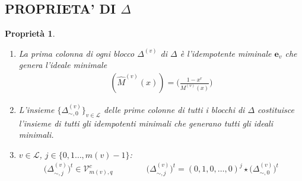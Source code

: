 \documentclass[mathserif]{beamer}
\def\quotient#1#2{%
   \raise1ex\hbox{$#1$}\Big/\lower1ex\hbox{$#2$}%
}
\newtheorem{prop}{Proprietà}
\begin{document}


\subsection{PROPRIETA' DI $\Delta$}
\begin{frame}
    \begin{prop}
    \begin{enumerate}
      \item  La prima colonna di ogni blocco $\Delta^{(v)}$ di $\Delta$ è l'idempotente miminale $\mathbf{e}_{v}$ che genera l'ideale minimale
      \begin{align*}
	  (\hat{M}^{(v)}(x)) = \Big(\frac{1-x^r}{M^{(v)}(x)} \Big)
      \end{align*}
      \item L'insieme $\lbrace \Delta_{\sim, 0}^{(v)} \rbrace_{v\in \mathscr{L}}$ delle prime colonne di tutti i blocchi di $\Delta$ costituisce l'insieme di tutti gli idempotenti minimali che generano tutti gli ideali minimali.
      \item  $v \in \mathscr{L}$, $j \in \lbrace 0, 1 \dots , m(v)-1 \rbrace$:
      \begin{align*}
      \big( \Delta_{\sim, j}^{(v)} \big)^{t} \in \mathcal{V}_{m(v), q}^{c}
      \qquad \qquad
      \big( \Delta_{\sim, j}^{(v)} \big)^{t}  =  (0,1,0,\dots,0)^{j} \star \big( \Delta_{\sim, 0}^{(v)} \big)^{t}
      \end{align*}
    \end{enumerate}
    \end{prop}
\end{frame}
\end{document}
